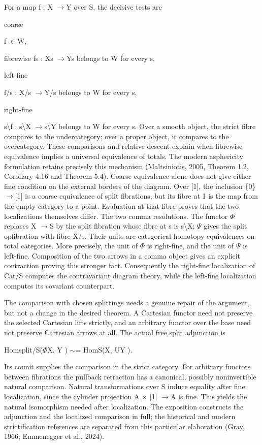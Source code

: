 For a map f : X \ensuremath{\to}Y over S, the decisive tests are


coarse


f \ensuremath{\in}W,


fibrewise fs : Xs \ensuremath{\to}Ys belongs to W for every s,


left-fine


f/s : X/s \ensuremath{\to}Y/s belongs to W for every s,


right-fine


s\textbackslash{}f : s\textbackslash{}X \ensuremath{\to}s\textbackslash{}Y belongs to W for every s. Over a smooth object, the strict fibre compares to the undercategory; over a proper object, it compares to the overcategory. These comparisons and relative descent explain when fibrewise equivalence implies a universal equivalence of totals. The modern asphericity formulation retains precisely this mechanism (Maltsiniotis, 2005, Theorem 1.2, Corollary 4.16 and Theorem 5.4). Coarse equivalence alone does not give either fine condition on the external borders of the diagram. Over [1], the inclusion \{0\} \ensuremath{\to}[1] is a coarse equivalence of split fibrations, but its fibre at 1 is the map from the empty category to a point. Evaluation at that fibre proves that the two localizations themselves differ. The two comma resolutions. The functor \ensuremath{\Phi} replaces X \ensuremath{\to}S by the split fibration whose fibre at s is s\textbackslash{}X; \ensuremath{\Psi} gives the split opfibration with fibre X/s. Their units are categorical homotopy equivalences on total categories. More precisely, the unit of \ensuremath{\Phi} is right-fine, and the unit of \ensuremath{\Psi} is left-fine. Composition of the two arrows in a comma object gives an explicit contraction proving this stronger fact. Consequently the right-fine localization of Cat/S computes the contravariant diagram theory, while the left-fine localization computes its covariant counterpart.


The comparison with chosen splittings needs a genuine repair of the argument, but not a change in the desired theorem. A Cartesian functor need not preserve the selected Cartesian lifts strictly, and an arbitrary functor over the base need not preserve Cartesian arrows at all. The actual free split adjunction is


Homsplit/S(\ensuremath{\Phi}X, Y ) \ensuremath{\sim}= HomS(X, UY ).


Its counit supplies the comparison in the strict category. For arbitrary functors between fibrations the pullback retraction has a canonical, possibly noninvertible natural comparison. Natural transformations over S induce equality after fine localization, since the cylinder projection A \ensuremath{\times} [1] \ensuremath{\to}A is fine. This yields the natural isomorphism needed after localization. The exposition constructs the adjunction and the localized comparison in full; the historical and modern strictification references are separated from this particular elaboration (Gray, 1966; Emmenegger et al., 2024).



